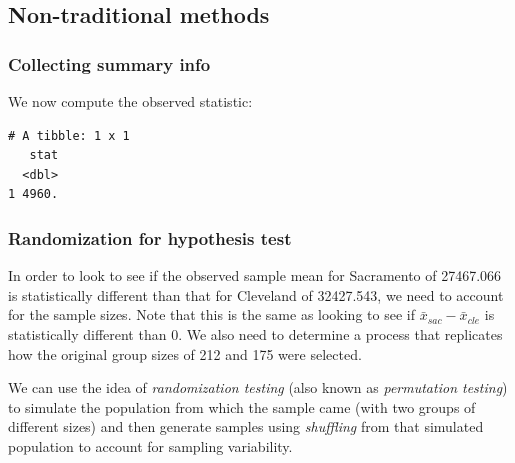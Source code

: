 \documentclass[12pt,]{krantz}
\makeatletter
\newenvironment{Shaded}{\begin{snugshade}}{\end{snugshade}}
\newcommand{\KeywordTok}[1]{\textcolor[rgb]{0.27,0.27,0.27}{\textbf{#1}}}
\newcommand{\DataTypeTok}[1]{\textcolor[rgb]{0.27,0.27,0.27}{#1}}
\newcommand{\StringTok}[1]{\textcolor[rgb]{0.5,0.5,0.5}{#1}}
\newcommand{\OperatorTok}[1]{\textcolor[rgb]{0.43,0.43,0.43}{\textbf{#1}}}
\newcommand{\NormalTok}[1]{#1}
\newenvironment{kframe}{%
\medskip{}
\setlength{\fboxsep}{.8em}
 \def\at@end@of@kframe{}%
 \ifinner\ifhmode%
  \def\at@end@of@kframe{\end{minipage}}%
  \begin{minipage}{\columnwidth}%
 \fi\fi%
 \def\FrameCommand##1{\hskip\@totalleftmargin \hskip-\fboxsep
 \colorbox{shadecolor}{##1}\hskip-\fboxsep
     \hskip-\linewidth \hskip-\@totalleftmargin \hskip\columnwidth}%
 \MakeFramed {\advance\hsize-\width
   \@totalleftmargin\z@ \linewidth\hsize
   \@setminipage}}%
 {\par\unskip\endMakeFramed%
 \at@end@of@kframe}
\renewenvironment{Shaded}{\begin{kframe}}{\end{kframe}}
\theoremstyle{definition}
\theoremstyle{definition}
\theoremstyle{definition}
\theoremstyle{remark}
\makeatother
\begin{document}
\subsection{Non-traditional methods}\label{non-traditional-methods-3}

\subsubsection*{Collecting summary
info}\label{collecting-summary-info-1}


We now compute the observed statistic:

\begin{Shaded}
\end{Shaded}

\begin{verbatim}
# A tibble: 1 x 1
   stat
  <dbl>
1 4960.
\end{verbatim}

\subsubsection*{Randomization for hypothesis
test}\label{randomization-for-hypothesis-test-1}


In order to look to see if the observed sample mean for Sacramento of
27467.066 is statistically different than that for Cleveland of
32427.543, we need to account for the sample sizes. Note that this is
the same as looking to see if \(\bar{x}_{sac} - \bar{x}_{cle}\) is
statistically different than 0. We also need to determine a process that
replicates how the original group sizes of 212 and 175 were selected.

We can use the idea of \emph{randomization testing} (also known as
\emph{permutation testing}) to simulate the population from which the
sample came (with two groups of different sizes) and then generate
samples using \emph{shuffling} from that simulated population to account
for sampling variability.
\end{document}
